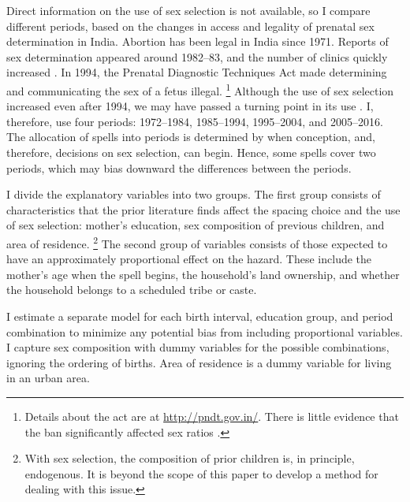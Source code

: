 \documentclass[12pt,letterpaper]{article}
\begin{document}
% 

Direct information on the use of sex selection is not available, so I compare different 
periods, based on the changes in access and legality of prenatal sex 
determination in India.
Abortion has been legal in India since 1971.
Reports of sex determination appeared around 1982--83, and the number of clinics 
quickly increased \citep{Sudha1999,bhat06,Grover2006}.
In 1994, the Prenatal Diagnostic Techniques Act made determining and communicating 
the sex of a fetus illegal.%
\footnote{
Details about the act are at \href{http://pndt.gov.in/}{http://pndt.gov.in/}.
There is little evidence that the ban significantly affected sex ratios \citep{Das-Gupta2016}.
}
Although the use of sex selection increased even after 1994, we may have passed a 
turning point in its use \citep{Das_Gupta2009,Diamond-Smith2015}.
I, therefore, use four periods: 1972--1984, 1985--1994, 1995--2004, and 2005--2016.
The allocation of spells into periods is determined by when conception, and, therefore, 
decisions on sex selection, can begin. 
Hence, some spells cover two periods, which may bias downward the differences between the 
periods.

I divide the explanatory variables into two groups.
The first group consists of characteristics that the prior literature finds affect 
the spacing choice and the use of sex selection:
mother's education, sex composition of previous children, and area of residence.%
\footnote{
With sex selection, the composition of prior children is, in principle, endogenous.
It is beyond the scope of this paper to develop a method for dealing with this issue.
}
The second group of variables consists of those expected to have an approximately 
proportional effect on the hazard.
These include the mother's age when the spell begins, the household's
land ownership, and whether the household belongs to a scheduled tribe
or caste.

I estimate a separate model for each birth interval, education group, and period 
combination to minimize any potential bias from including proportional variables.
I capture sex composition with dummy variables for the
possible combinations, ignoring the ordering of births.
Area of residence is a dummy variable for living in an urban area.

\end{document}
